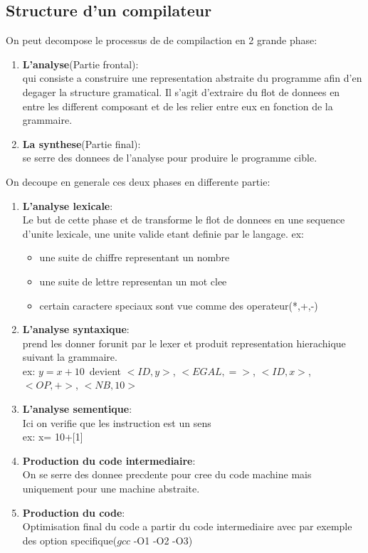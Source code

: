 \documentclass[a4paper,11pt]{article}
\begin{document}
  \subsection{Structure d'un compilateur}
  On peut decompose le processus de de compilaction en 2 grande phase:
  \begin{enumerate}
    \item \textbf{L'analyse}(Partie frontal):\\
          qui consiste a construire une representation abstraite du programme afin d'en degager la structure gramatical. Il s'agit d'extraire du flot de donnees en entre les different composant et de les relier entre eux en fonction de la grammaire.
    \item \textbf{La synthese}(Partie final):\\
          se serre des donnees de l'analyse pour produire le programme cible.
  \end{enumerate}
  On decoupe en generale ces deux phases en differente partie:
  \begin{enumerate}
    \item \textbf{L'analyse lexicale}:\\
    Le but de cette phase et de transforme le flot de donnees en une sequence d'unite lexicale, une unite valide etant definie par le langage. 
      ex:
      \begin{itemize}
        \item une suite de chiffre representant un nombre
        \item une suite de lettre representan un mot clee
        \item certain caractere speciaux sont vue comme des operateur(*,+,-)
      \end{itemize}
    \item \textbf{L'analyse syntaxique}:\\
      prend les donner forunit par le lexer et produit representation hierachique suivant la grammaire.\\
      ex: $y=x+10$\ devient $<ID,y>$, $<EGAL,=>$, $<ID,x>$, $<OP,+>$, $<NB,10>$
    \item \textbf{L'analyse sementique}:\\
          Ici on verifie que les instruction est un sens\\
          ex: x= 10+[1]
    \item \textbf{Production du code intermediaire}:\\
      On se serre des donnee precdente pour cree du code machine mais uniquement pour une  machine abstraite.
    \item \textbf{Production du code}:\\
    Optimisation final du code a partir du code intermediaire avec par exemple des option specifique($gcc$ -O1 -O2 -O3)
  \end{enumerate}
\end{document}
